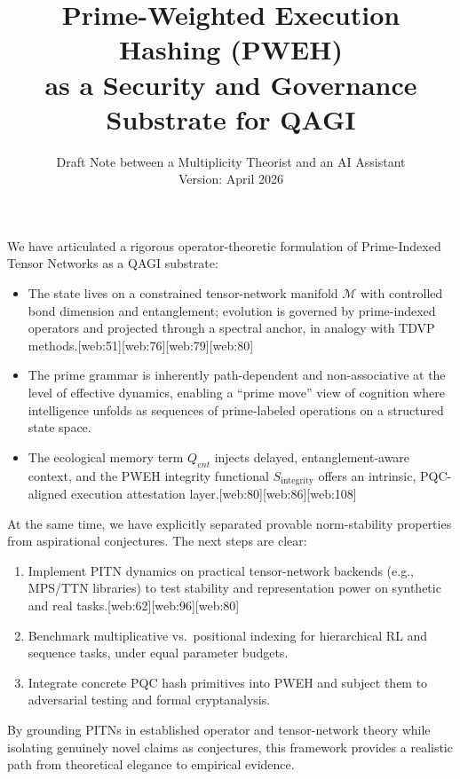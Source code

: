 \documentclass[11pt]{article}
\begin{document}
We have articulated a rigorous operator-theoretic formulation of Prime-Indexed Tensor Networks as a QAGI substrate:
\begin{itemize}[leftmargin=*]
  \item The state lives on a constrained tensor-network manifold \( \mathcal{M} \) with controlled bond dimension and entanglement; evolution is governed by prime-indexed operators and projected through a spectral anchor, in analogy with TDVP methods.[web:51][web:76][web:79][web:80]
  \item The prime grammar is inherently path-dependent and non-associative at the level of effective dynamics, enabling a ``prime move'' view of cognition where intelligence unfolds as sequences of prime-labeled operations on a structured state space.
  \item The ecological memory term \( Q_{ent} \) injects delayed, entanglement-aware context, and the PWEH integrity functional \( S_{\text{integrity}} \) offers an intrinsic, PQC-aligned execution attestation layer.[web:80][web:86][web:108]
\end{itemize}

At the same time, we have explicitly separated provable norm-stability properties from aspirational conjectures. The next steps are clear:
\begin{enumerate}[leftmargin=*]
  \item Implement PITN dynamics on practical tensor-network backends (e.g., MPS/TTN libraries) to test stability and representation power on synthetic and real tasks.[web:62][web:96][web:80]
  \item Benchmark multiplicative vs.\ positional indexing for hierarchical RL and sequence tasks, under equal parameter budgets.
  \item Integrate concrete PQC hash primitives into PWEH and subject them to adversarial testing and formal cryptanalysis.
\end{enumerate}

By grounding PITNs in established operator and tensor-network theory while isolating genuinely novel claims as conjectures, this framework provides a realistic path from theoretical elegance to empirical evidence.

\title{Prime-Weighted Execution Hashing (PWEH) \\
as a Security and Governance Substrate for QAGI}
\author{%
  Draft Note between a Multiplicity Theorist and an AI Assistant\\[4pt]
  \normalsize{}Version: April 2026
}
\date{}
\end{document}
